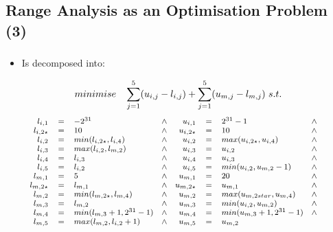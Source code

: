 \documentclass[compress]{beamer}
\begin{document}
\subsection{Range Analysis as an Optimisation Problem (3)}
\begin{frame}[fragile]
	\frametitle{\insertsubsection}

\begin{itemize}
\item Is decomposed into:
\end{itemize}

\[
\small
minimise\quad\sum_{j=1}^{5} (u_{i,j} - l_{i,j}) + \sum_{j=1}^{5} (u_{m,j} - l_{m,j})~s.t.
\]
\[
\footnotesize
\begin{array}{rcl@{\quad}c@{\quad}rcl@{\quad}clll}
l_{i,1} & = & -2^{31} & \wedge & u_{i,1} & = & 2^{31} - 1 & \wedge &  \\
l_{i,2{\star}} & = & 10 & \wedge & u_{i,2{\star}} & = & 10 & \wedge & \\
l_{i,2} & = & min(l_{i,2{\star}}, l_{i,4}) & \wedge & u_{i,2} & = & max(u_{i,2{\star}}, u_{i,4}) & \wedge \\
l_{i,3} & = & max(l_{i,2}, l_{m,2}) & \wedge & u_{i,3} & = & u_{i,2} & \wedge \\
l_{i,4} & = & l_{i,3} & \wedge & u_{i,4} & = & u_{i,3} & \wedge \\
l_{i,5} & = & l_{i,2} & \wedge & u_{i,5} & = & min(u_{i,2}, u_{m,2}-1) & \wedge \\
l_{m,1} & = & 5 & \wedge & u_{m,1} & = & 20 & \wedge \\
l_{m,2{\star}} & = & l_{m,1} & \wedge & u_{m,2{\star}} & = & u_{m,1} & \wedge \\
l_{m,2} & = & min(l_{m,2{\star}}, l_{m,4}) & \wedge & u_{m,2} & = & max(u_{m,2{star}}, u_{m,4}) & \wedge \\
l_{m,3} & = & l_{m,2} & \wedge & u_{m,3} & = & min(u_{i,2}, u_{m,2}) & \wedge \\
l_{m,4} & = & min({l_{m,3}} + 1, 2^{31} - 1) & \wedge & u_{m,4} & = & min(u_{m,3} + 1, 2^{31} - 1) & \wedge \\
l_{m,5} & = & max(l_{m,2}, l_{i,2} + 1) & \wedge & u_{m,5} & = & u_{m,2}
\end{array}
\]

\end{frame}
\end{document}
